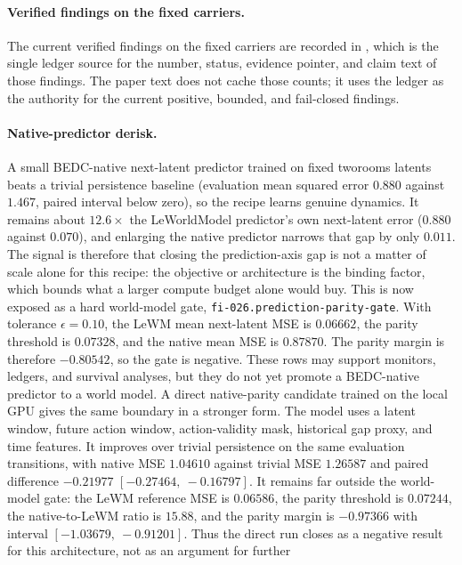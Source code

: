 \paragraph{Verified findings on the fixed carriers.}
The current verified findings on the fixed carriers are recorded in
,
which is the single ledger source for the number, status, evidence pointer, and
claim text of those findings.  The paper text does not cache those counts; it
uses the ledger as the authority for the current positive, bounded, and
fail-closed findings.

\paragraph{Native-predictor derisk.}
A small BEDC-native next-latent predictor trained on fixed tworooms latents
beats a trivial persistence baseline (evaluation mean squared error $0.880$
against $1.467$, paired interval below zero), so the recipe learns genuine
dynamics.  It remains about $12.6\times$ the LeWorldModel predictor's own
next-latent error ($0.880$ against $0.070$), and enlarging the native predictor
narrows that gap by only $0.011$.  The signal is therefore that closing the
prediction-axis gap is not a matter of scale alone for this recipe: the
objective or architecture is the binding factor, which bounds what a larger
compute budget alone would buy.
This is now exposed as a hard world-model gate,
\texttt{fi-026.prediction-parity-gate}.  With tolerance $\epsilon=0.10$, the
LeWM mean next-latent MSE is $0.06662$, the parity threshold is $0.07328$, and
the native mean MSE is $0.87870$.  The parity margin is therefore $-0.80542$,
so the gate is negative.  These rows may support monitors, ledgers, and
survival analyses, but they do not yet promote a BEDC-native predictor to a
world model.
A direct native-parity candidate trained on the local GPU gives the same
boundary in a stronger form.  The model uses a latent window, future action
window, action-validity mask, historical gap proxy, and time features.  It
improves over trivial persistence on the same evaluation transitions, with
native MSE $1.04610$ against trivial MSE $1.26587$ and paired difference
$-0.21977$ $[-0.27464,\ -0.16797]$.  It remains far outside the
world-model gate: the LeWM reference MSE is $0.06586$, the parity threshold
is $0.07244$, the native-to-LeWM ratio is $15.88$, and the parity margin is
$-0.97366$ with interval $[-1.03679,\ -0.91201]$.  Thus the direct run closes
as a negative result for this architecture, not as an argument for further

